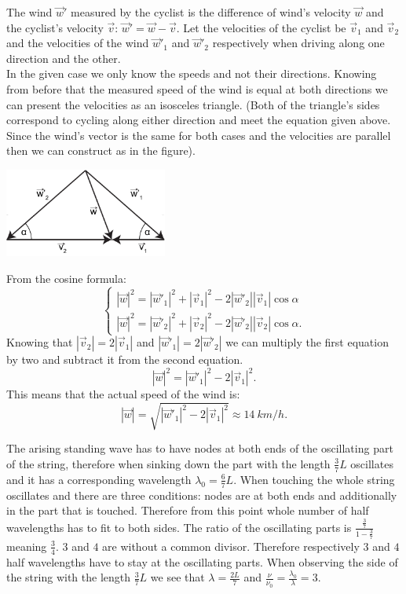 \documentclass[11pt]{article}
\begin{document}
\solueng
The wind $\vec w'$ measured by the cyclist is the difference of wind’s velocity $\vec w$ and the cyclist’s velocity $\vec v$: $\vec w'=\vec w - \vec v$. Let the velocities of the cyclist be $\vec v_1$ and $\vec v_2$ and the velocities of the wind $\vec w'_1$ and $\vec w'_2$ respectively when driving along one direction and the other.\\
In the given case we only know the speeds and not their directions. Knowing from before that the measured speed of the wind is equal at both directions we can present the velocities as an isosceles triangle. (Both of the triangle’s sides correspond to cycling along either direction and meet the equation given above. Since the wind’s vector is the same for both cases and the velocities are parallel then we can construct as in the figure).
\begin{center}
\includegraphics[width=0.4\textwidth]{2013-v3g-03-jalgrattur}\\
\end{center}
From the cosine formula:
$$
\begin{cases}
|\vec w|^2 = |\vec w'_1|^2 + |\vec v_1|^2  - 2  |\vec w'_2|  |\vec v_1|\cos \alpha \\
|\vec w|^2 = |\vec w'_2|^2 + |\vec v_2|^2  - 2  |\vec w'_2|  |\vec v_2|\cos \alpha.
\end{cases}
$$
Knowing that $ |\vec v_2|=2 |\vec v_1|$ and $ |\vec w'_1|=2 |\vec w'_2|$ we can multiply the first equation by two and subtract it from the second equation.
$$|\vec w|^2 = |\vec w'_1|^2 - 2|\vec v_1|^2. $$
This means that the actual speed of the wind is:
$$|\vec w|=\sqrt{|\vec w'_1|^2-2|\vec v_1|^2} \approx \SI{14}{km \per h}.$$
\probend
\bigskip


\solueng
The arising standing wave has to have nodes at both ends of the oscillating part of the string, therefore when sinking down the part with the length $\frac{3}{7}L$ oscillates and it has a corresponding wavelength $\lambda_0=\frac{6}{7}L$. When touching the whole string oscillates and there are three conditions: nodes are at both ends and additionally in the part that is touched. Therefore from this point whole number of half wavelengths has to fit to both sides. The ratio of the oscillating parts is $\frac{\frac{3}{7}}{1-\frac{3}{7}}$ meaning $\frac{3}{4}$. $3$ and $4$ are without a common divisor. Therefore respectively $3$ and $4$ half wavelengths have to stay at the oscillating parts. When observing the side of the string with the length $\frac{3}{7}L$ we see that $\lambda=\frac{2L}{7}$ and $\frac{\nu}{\nu_0}=\frac{\lambda_0}{\lambda}=3$.
\probend
\bigskip
\end{document}
